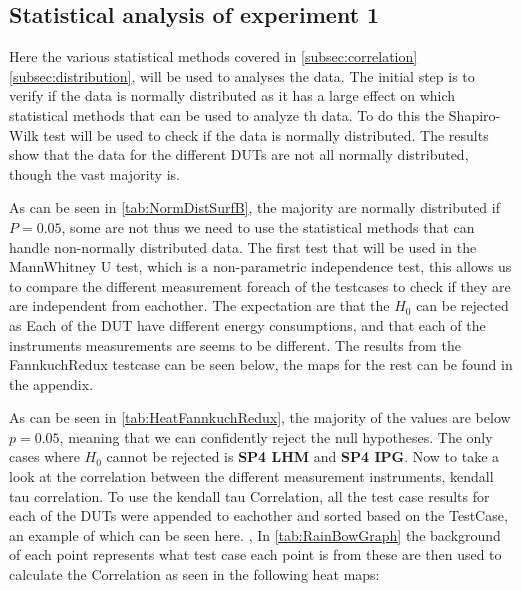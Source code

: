 \subsection{Statistical analysis of experiment 1}
Here the various statistical methods covered in \cref{subsec:correlation}\cref{subsec:distribution}, will be used to analyses the data. The initial step is to verify if the data is normally distributed as it has a large effect on which statistical methods that can be used to analyze th data. To do this the Shapiro-Wilk test will be used to check if the data is normally distributed. 
The results show that the data for the different DUTs are not all normally distributed, though the vast majority is.

As can be seen in \cref{tab:NormDistSurfB}, the majority are normally distributed if $P = 0.05$, some are not thus we need to use the statistical methods that can handle non-normally distributed data. The first test that will be used in the MannWhitney U test, which is a non-parametric independence test, this allows us to compare the different measurement foreach of the testcases to check if they are are independent from eachother. The expectation are that the $H_0$ can be rejected as Each of the DUT have different energy consumptions, and that each of the instruments measurements are seems to be different.
The results from the FannkuchRedux testcase can be seen below, the maps for the rest can be found in the appendix.
 
As can be seen in \cref{tab:HeatFannkuchRedux}, the majority of the values are below $p = 0.05$, meaning that we can confidently reject the null hypotheses. The only cases where $H_0$ cannot be rejected is \textbf{SP4 LHM} and \textbf{SP4 IPG}.
Now to take a look at the correlation between the different measurement instruments, kendall tau correlation. To use the kendall tau Correlation, all the test case results for each of the DUTs were appended to eachother and sorted based on the TestCase, an example of which can be seen here.
,
In \cref{tab:RainBowGraph} the background of each point represents what test case each point is from these are then used to calculate the Correlation as seen in the following heat maps:


% 
